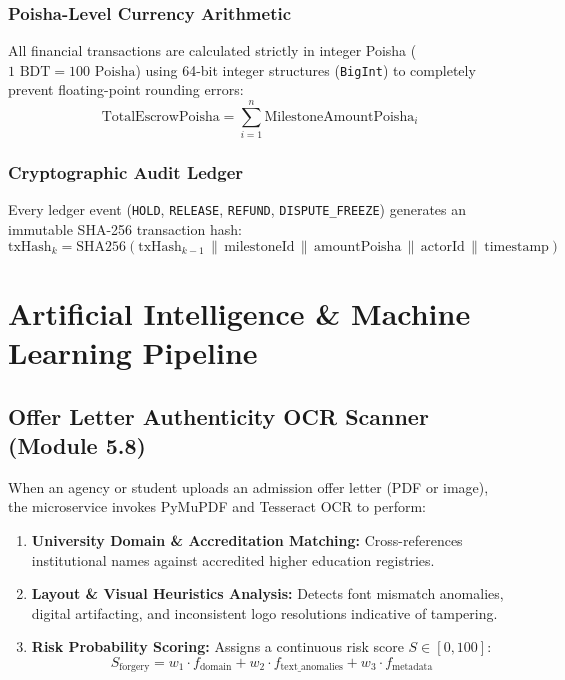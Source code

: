 \documentclass[11pt,a4paper]{article}
\begin{document}
\subsubsection{Poisha-Level Currency Arithmetic}
All financial transactions are calculated strictly in integer Poisha ($1\text{ BDT} = 100\text{ Poisha}$) using 64-bit integer structures (\texttt{BigInt}) to completely prevent floating-point rounding errors:
\begin{equation}
\text{TotalEscrowPoisha} = \sum_{i=1}^{n} \text{MilestoneAmountPoisha}_i
\end{equation}

\subsubsection{Cryptographic Audit Ledger}
Every ledger event (\texttt{HOLD}, \texttt{RELEASE}, \texttt{REFUND}, \texttt{DISPUTE\_FREEZE}) generates an immutable SHA-256 transaction hash:
\begin{equation}
\text{txHash}_k = \text{SHA256}\left(\text{txHash}_{k-1} \,\|\, \text{milestoneId} \,\|\, \text{amountPoisha} \,\|\, \text{actorId} \,\|\, \text{timestamp}\right)
\end{equation}

\section{Artificial Intelligence \& Machine Learning Pipeline}

\subsection{Offer Letter Authenticity OCR Scanner (Module 5.8)}
When an agency or student uploads an admission offer letter (PDF or image), the microservice invokes PyMuPDF and Tesseract OCR to perform:
\begin{enumerate}
    \item \textbf{University Domain \& Accreditation Matching:} Cross-references institutional names against accredited higher education registries.
    \item \textbf{Layout \& Visual Heuristics Analysis:} Detects font mismatch anomalies, digital artifacting, and inconsistent logo resolutions indicative of tampering.
    \item \textbf{Risk Probability Scoring:} Assigns a continuous risk score $S \in [0, 100]$:
    \begin{equation}
    S_{\text{forgery}} = w_1 \cdot f_{\text{domain}} + w_2 \cdot f_{\text{text\_anomalies}} + w_3 \cdot f_{\text{metadata}}
    \end{equation}
\end{enumerate}
\end{document}
